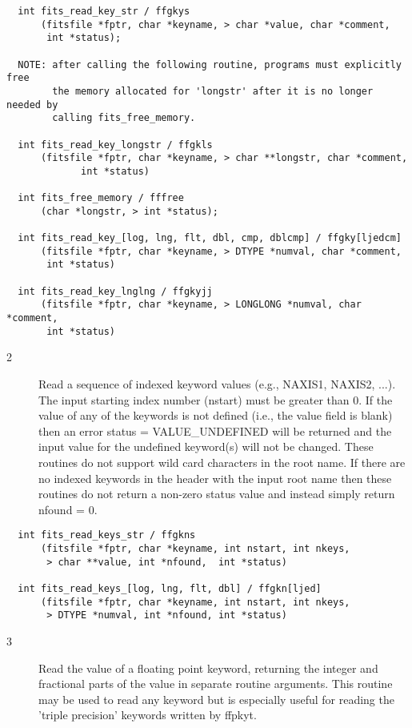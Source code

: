 \documentclass[11pt]{book}
\begin{document}
\begin{verbatim}
  int fits_read_key_str / ffgkys
      (fitsfile *fptr, char *keyname, > char *value, char *comment,
       int *status);

  NOTE: after calling the following routine, programs must explicitly free
        the memory allocated for 'longstr' after it is no longer needed by
        calling fits_free_memory.

  int fits_read_key_longstr / ffgkls
      (fitsfile *fptr, char *keyname, > char **longstr, char *comment,
             int *status)

  int fits_free_memory / fffree
      (char *longstr, > int *status);

  int fits_read_key_[log, lng, flt, dbl, cmp, dblcmp] / ffgky[ljedcm]
      (fitsfile *fptr, char *keyname, > DTYPE *numval, char *comment,
       int *status)

  int fits_read_key_lnglng / ffgkyjj
      (fitsfile *fptr, char *keyname, > LONGLONG *numval, char *comment,
       int *status)
\end{verbatim}

\begin{description}
\item[2 ] Read a sequence of indexed keyword values (e.g., NAXIS1, NAXIS2, ...).
    The input starting index number (nstart) must be greater than 0.
    If the value of any of the keywords is not defined (i.e., the value
    field is blank) then an error status = VALUE\_UNDEFINED will be
    returned and the input value for the undefined keyword(s) will not
    be changed.  These routines do not support wild card characters in
    the root name.  If there are no indexed keywords in the header with
    the input root name then these routines do not return a non-zero
   status value and instead simply return nfound = 0. \label{ffgknx}
\end{description}

\begin{verbatim}
  int fits_read_keys_str / ffgkns
      (fitsfile *fptr, char *keyname, int nstart, int nkeys,
       > char **value, int *nfound,  int *status)

  int fits_read_keys_[log, lng, flt, dbl] / ffgkn[ljed]
      (fitsfile *fptr, char *keyname, int nstart, int nkeys,
       > DTYPE *numval, int *nfound, int *status)
\end{verbatim}

\begin{description}
\item[3 ] Read the value of a floating point keyword, returning the integer and
    fractional parts of the value in separate routine arguments.
    This routine may be used to read any keyword but is especially
    useful for reading the 'triple precision' keywords written by ffpkyt.
  \label{ffgkyt}
\end{description}
\end{document}
